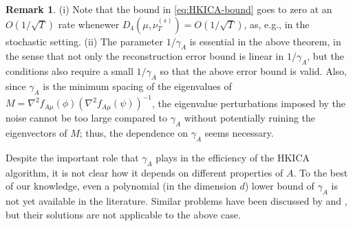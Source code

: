 \documentclass[jmlr]{article}
\theoremstyle{definition}
\newtheorem{remark}[lemma]{Remark}
\newcommand{\eps}{\epsilon}
\begin{document}
\fi
\begin{remark}
(i) Note that the bound in \eqref{eq:HKICA-bound} goes to zero at an $O(1/\sqrt{T})$ rate whenewer $D_4(\mu,\nu_T^{(s)})=O(1/\sqrt{T})$, as, e.g., in the stochastic setting.
(ii) The parameter $1/\gamma_A$ is essential in the above theorem, in the sense that not only the reconstruction error bound is linear in $1/\gamma_A$, but the conditions also require a small $1/\gamma_A$ so that the above error bound is valid. 
Also, since $\gamma_A$ is the minimum spacing of the eigenvalues of $M=\nabla^2 f_{A\mu}(\phi) (\nabla^2 f_{A\mu}(\psi))^{-1}$, the eigenvalue perturbations imposed by the noise cannot be too large compared to $\gamma_A$ without potentially  ruining the eigenvectors of $M$; thus, the dependence on $\gamma_A$ seems necessary.

\end{remark}

Despite the important role that $\gamma_A$ plays in the efficiency of the HKICA algorithm, it is not clear how it depends on different properties of $A$.
To the best of our knowledge, even a polynomial (in the dimension $d$) lower bound of $\gamma_A$ is not yet available in the literature. 
Similar problems have been discussed by  \citet{husler1987minimal} and \citet{goyal2014fourier}, but their solutions are not applicable to the above case.
\end{document}
